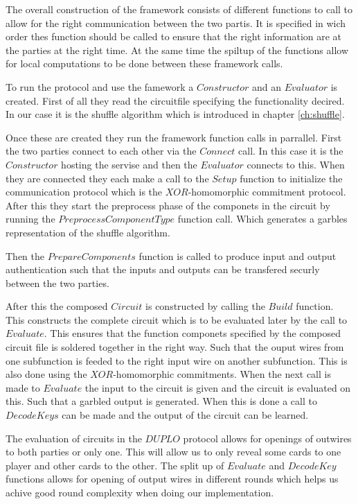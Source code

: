 \documentclass[twoside,11pt,openright]{report}
\begin{document}
The overall construction of the framework consists of different functions to call to allow for the right communication between the two partis. It is specified in wich order thes function should be called to ensure that the right information are at the parties at the right time. At the same time the spiltup of the functions allow for local computations to be done between these framework calls.

To run the protocol and use the famework a $Constructor$ and an $Evaluator$ is created. First of all they read the circuitfile specifying the functionality decired. In our case it is the shuffle algorithm which is introduced in chapter \ref{ch:shuffle}.

Once these are created they run the framework function calls in parrallel. First the two parties connect to each other via the $Connect$ call. In this case it is the $Constructor$ hosting the servise and then the $Evaluator$ connects to this. When they are connected they each make a call to the $Setup$ function to initialize the communication protocol which is the $XOR$-homomorphic commitment protocol. After this they start the preprocess phase of the componets in the circuit by running the $PreprocessComponentType$ function call. Which generates a garbles representation of the shuffle algorithm.

Then the $PrepareComponents$ function is called to produce input and output authentication such that the inputs and outputs can be transfered securly between the two parties.

After this the composed $Circuit$ is constructed by calling the $Build$ function. This constructs the complete circuit which is to be evaluated later by the call to $Evaluate$. This ensures that the function componets specified by the composed circuit file is soldered together in the right way. Such that the ouput wires from one subfunction is feeded to the right input wire on another subfunction. This is also done using the $XOR$-homomorphic commitments. When the next call is made to $Evaluate$ the input to the circuit is given and the circuit is evaluated on this. Such that a garbled output is generated. When this is done a call to $DecodeKeys$ can be made and the output of the circuit can be learned.

\bigskip

The evaluation of circuits in the $DUPLO$ protocol allows for openings of outwires to both parties or only one. This will allow us to only reveal some cards to one player and other cards to the other. The split up of $Evaluate$ and $DecodeKey$ functions allows for opening of output wires in different rounds which helps us achive good round complexity when doing our implementation.
\end{document}

